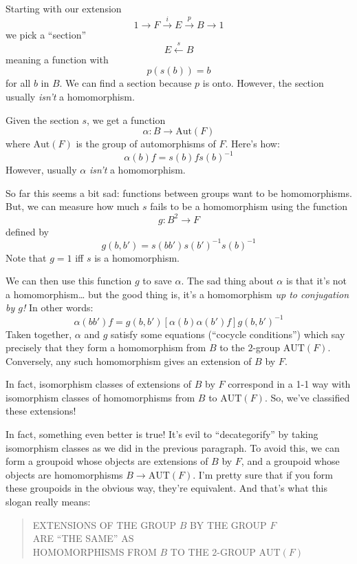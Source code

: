 \documentclass{article}
\begin{document}
Starting with our extension
\[1\to F\xrightarrow{i}E\xrightarrow{p}B\to 1\] we pick a ``section''
\[E\xleftarrow{s}B\] meaning a function with \[p(s(b)) = b\] for all
\(b\) in \(B\). We can find a section because \(p\) is onto. However,
the section usually \emph{isn't} a homomorphism.

Given the section \(s\), we get a function
\[\alpha\colon B \to \mathrm{Aut}(F)\] where \(\mathrm{Aut}(F)\) is the
group of automorphisms of \(F\). Here's how:
\[\alpha(b) f = s(b) f s(b)^{-1}\] However, usually \(\alpha\)
\emph{isn't} a homomorphism.

So far this seems a bit sad: functions between groups want to be
homomorphisms. But, we can measure how much \(s\) fails to be a
homomorphism using the function \[g\colon B^2 \to F\] defined by
\[g(b,b') = s(bb') s(b')^{-1} s(b)^{-1}\] Note that \(g = 1\) iff \(s\)
is a homomorphism.

We can then use this function \(g\) to save \(\alpha\). The sad thing
about \(\alpha\) is that it's not a homomorphism\ldots{} but the good
thing is, it's a homomorphism \emph{up to conjugation by \(g\)!} In
other words:
\[\alpha(bb') f = g(b,b') [ \alpha(b) \alpha(b') f ] g(b,b')^{-1}\]
Taken together, \(\alpha\) and \(g\) satisfy some equations (``cocycle
conditions'') which say precisely that they form a homomorphism from
\(B\) to the \(2\)-group \(\mathrm{AUT}(F)\). Conversely, any such
homomorphism gives an extension of \(B\) by \(F\).

In fact, isomorphism classes of extensions of \(B\) by \(F\) correspond
in a 1-1 way with isomorphism classes of homomorphisms from \(B\) to
\(\mathrm{AUT}(F)\). So, we've classified these extensions!

In fact, something even better is true! It's evil to ``decategorify'' by
taking isomorphism classes as we did in the previous paragraph. To avoid
this, we can form a groupoid whose objects are extensions of \(B\) by
\(F\), and a groupoid whose objects are homomorphisms
\(B \to \mathrm{AUT}(F)\). I'm pretty sure that if you form these
groupoids in the obvious way, they're equivalent. And that's what this
slogan really means:

\begin{quote}
EXTENSIONS OF THE GROUP \(B\) BY THE GROUP \(F\)\\
ARE ``THE SAME'' AS\\
HOMOMORPHISMS FROM \(B\) TO THE \(2\)-GROUP \(\mathrm{AUT}(F)\)
\end{quote}
\end{document}
